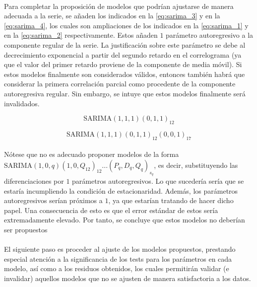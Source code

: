 \documentclass[a4paper, spanish]{article}
\begin{document}
      \paragraph{}
      Para completar la proposición de modelos que podrían ajustarse de manera adecuada a la serie, se añaden los indicados en la \autoref{eq:sarima_3} y en la \autoref{eq:sarima_4}, los cuales son ampliaciones de los indicados en la \autoref{eq:sarima_1} y en la \autoref{eq:sarima_2} respectivamente. Estos añaden $1$ parámetro autoregresivo a la componente regular de la serie. La justificación sobre este parámetro se debe al decrecimiento exponencial a partir del segundo retardo en el correlograma (ya que el valor del primer retardo proviene de la componente de media móvil). Si estos modelos finalmente son considerados válidos, entonces también habrá que considerar la primera correlación parcial como procedente de la componente autoregresiva regular. Sin embargo, se intuye que estos modelos finalmente será invalidados.

      \begin{equation}
        \label{eq:sarima_3}
        \text{SARIMA}(1, 1, 1)(0, 1, 1)_{12}
      \end{equation}

      \begin{equation}
        \label{eq:sarima_4}
        \text{SARIMA}(1, 1, 1)(0, 1, 1)_{12}(0, 0, 1)_{17}
      \end{equation}

      \paragraph{}
      Nótese que no es adecuado proponer modelos de la forma $\text{SARIMA}(1, 0, q)(1, 0, Q_{12})_{12}...(P_q, D_q, Q_q)_{s_q}$, es decir, substituyendo las diferenciaciones por $1$ parámetros autoregresivos. Lo que sucedería sería que se estaría incumpliendo la condición de estacionaridad. Además, los parámetros autoregresivos serían próximos a $1$, ya que estarían tratando de hacer dicho papel. Una consecuencia de esto es que el error estándar de estos sería extremadamente elevado. Por tanto, se concluye que estos modelos no deberían ser propuestos

      \paragraph{}
      El siguiente paso es proceder al ajuste de los modelos propuestos, prestando especial atención a la significancia de los tests para los parámetros en cada modelo, así como a los residuos obtenidos, los cuales permitirán validar (e invalidar) aquellos modelos que no se ajusten de manera satisfactoria a los datos.
\end{document}
